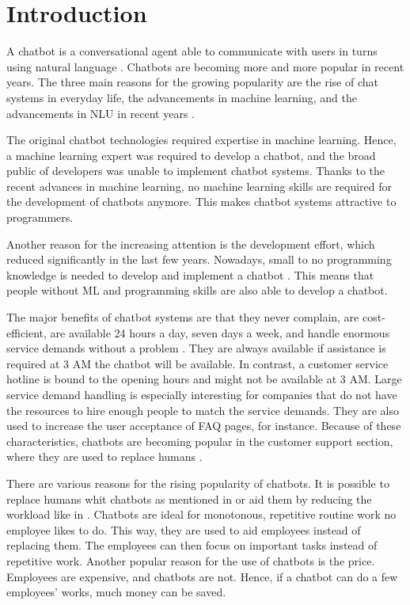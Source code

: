 \section{Introduction} %
A chatbot is a conversational agent able to communicate with users in turns using natural language \cite{evaluateChatbotsShawar2007, shawar2007chatbots, huang2007extracting, gregori2017evaluation}.
Chatbots are becoming more and more popular in recent years.
The three main reasons for the growing popularity are the rise of chat systems in everyday life, the advancements in machine learning, and the advancements in NLU in recent years \cite{braunEvaluatingNLU}.

The original chatbot technologies required expertise in machine learning.
Hence, a machine learning expert was required to develop a chatbot, and the broad public of developers was unable to implement chatbot systems.
Thanks to the recent advances in machine learning, no machine learning skills are required for the development of chatbots anymore.
This makes chatbot systems attractive to programmers. 

Another reason for the increasing attention is the development effort, which reduced significantly in the last few years.
Nowadays, small to no programming knowledge is needed to develop and implement a chatbot \cite{braunEvaluatingNLU}.
This means that people without ML and programming skills are also able to develop a chatbot.

The major benefits of chatbot systems are that they never complain, are cost-efficient, are available 24 hours a day, seven days a week, and handle enormous service demands without a problem \cite{singhbuilding}.
They are always available if assistance is required at 3 AM the chatbot will be available. 
In contrast, a customer service hotline is bound to the opening hours and might not be available at 3 AM.
Large service demand handling is especially interesting for companies that do not have the resources to hire enough people to match the service demands.
They are also used to increase the user acceptance of FAQ pages, for instance.
Because of these characteristics, chatbots are becoming popular in the customer support section, where they are used to replace humans \cite{GO2019304}.

There are various reasons for the rising popularity of chatbots.
It is possible to replace humans whit chatbots as mentioned in \citet{rahman2017programming} or aid them by reducing the workload like in \citet{deshpande2017survey}.
Chatbots are ideal for monotonous, repetitive routine work no employee likes to do.
This way, they are used to aid employees instead of replacing them.
The employees can then focus on important tasks instead of repetitive work.
Another popular reason for the use of chatbots is the price.
Employees are expensive, and chatbots are not.
Hence, if a chatbot can do a few employees' works, much money can be saved.

